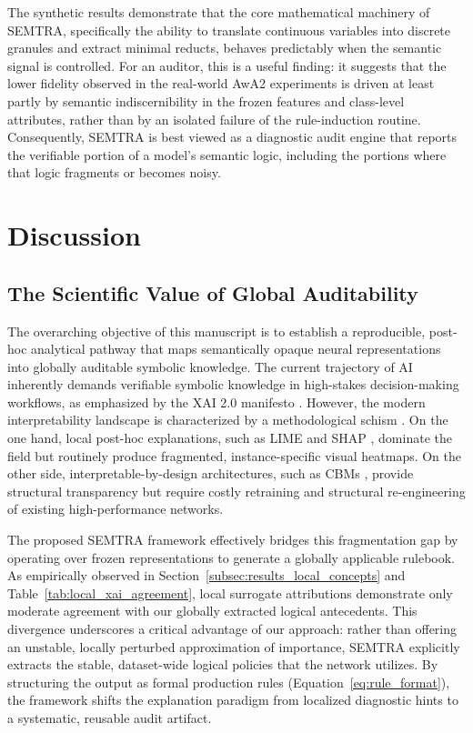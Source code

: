 \documentclass[make,article,submit,pdftex,moreauthors]{Definitions/mdpi}
\begin{document}
The synthetic results demonstrate that the core mathematical machinery of SEMTRA, specifically the ability to translate continuous variables into discrete granules and extract minimal reducts, behaves predictably when the semantic signal is controlled. For an auditor, this is a useful finding: it suggests that the lower fidelity observed in the real-world AwA2 experiments is driven at least partly by semantic indiscernibility in the frozen features and class-level attributes, rather than by an isolated failure of the rule-induction routine. Consequently, SEMTRA is best viewed as a diagnostic audit engine that reports the verifiable portion of a model's semantic logic, including the portions where that logic fragments or becomes noisy.

\section{Discussion}
\label{sec:discussion}

\subsection{The Scientific Value of Global Auditability}
\label{subsec:scientific_value}

The overarching objective of this manuscript is to establish a reproducible, post-hoc analytical pathway that maps semantically opaque neural representations into globally auditable symbolic knowledge. The current trajectory of AI inherently demands verifiable symbolic knowledge in high-stakes decision-making workflows, as emphasized by the XAI 2.0 manifesto \cite{Longo2024XAI}. However, the modern interpretability landscape is characterized by a methodological schism \cite{Mersha2024XAISurvey}. On the one hand, local post-hoc explanations, such as LIME and SHAP \cite{Salih2025SHAPLIME}, dominate the field but routinely produce fragmented, instance-specific visual heatmaps. On the other side, interpretable-by-design architectures, such as CBMs \cite{Srivastava2024VLGCBM}, provide structural transparency but require costly retraining and structural re-engineering of existing high-performance networks. 

The proposed SEMTRA framework effectively bridges this fragmentation gap by operating over frozen representations to generate a globally applicable rulebook. As empirically observed in Section~\ref{subsec:results_local_concepts} and Table~\ref{tab:local_xai_agreement}, local surrogate attributions demonstrate only moderate agreement with our globally extracted logical antecedents. This divergence underscores a critical advantage of our approach: rather than offering an unstable, locally perturbed approximation of importance, SEMTRA explicitly extracts the stable, dataset-wide logical policies that the network utilizes. By structuring the output as formal production rules (Equation~\eqref{eq:rule_format}), the framework shifts the explanation paradigm from localized diagnostic hints to a systematic, reusable audit artifact.
\end{document}
